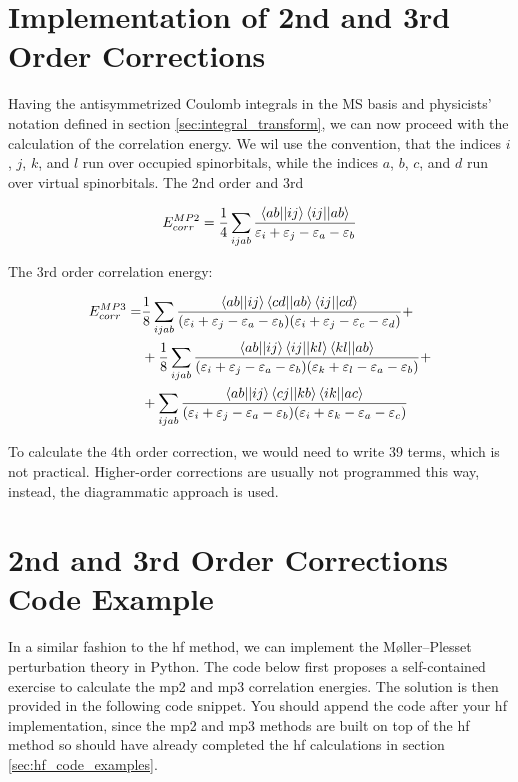 \section{Implementation of 2nd and 3rd Order Corrections}

Having the antisymmetrized Coulomb integrals in the MS basis and physicists' notation defined in section \ref{sec:integral_transform}, we can now proceed with the calculation of the correlation energy. We wil use the convention, that the indices \(i\), \(j\), \(k\), and \(l\) run over occupied spinorbitals, while the indices \(a\), \(b\), \(c\), and \(d\) run over virtual spinorbitals. The 2nd order and 3rd

\begin{equation}
E_{corr}^{MP2}=\frac{1}{4}\sum_{ijab}\frac{\braket{ab||ij}\braket{ij||ab}}{\varepsilon_i+\varepsilon_j-\varepsilon_a-\varepsilon_b}
\end{equation}

The 3rd order correlation energy:

\begin{align}
E_{corr}^{MP3}=&\frac{1}{8}\sum_{ijab}\frac{\braket{ab||ij}\braket{cd||ab}\braket{ij||cd}}{(\varepsilon_i+\varepsilon_j-\varepsilon_a-\varepsilon_b)(\varepsilon_i+\varepsilon_j-\varepsilon_c-\varepsilon_d)}+\nonumber \\
&+\frac{1}{8}\sum_{ijab}\frac{\braket{ab||ij}\braket{ij||kl}\braket{kl||ab}}{(\varepsilon_i+\varepsilon_j-\varepsilon_a-\varepsilon_b)(\varepsilon_k+\varepsilon_l-\varepsilon_a-\varepsilon_b)}+\nonumber \\
&+\sum_{ijab}\frac{\braket{ab||ij}\braket{cj||kb}\braket{ik||ac}}{(\varepsilon_i+\varepsilon_j-\varepsilon_a-\varepsilon_b)(\varepsilon_i+\varepsilon_k-\varepsilon_a-\varepsilon_c)}
\end{align}

To calculate the 4th order correction, we would need to write 39 terms, which is not practical. Higher-order corrections are usually not programmed this way, instead, the diagrammatic approach is used.\cite{1014569052,10.1016/0010-4655!73!90016-7,10.1016/0010-4655!73!90017-9}

\section{2nd and 3rd Order Corrections Code Example}

In a similar fashion to the \acrshort{hf} method, we can implement the Møller--Plesset perturbation theory in Python. The code below first proposes a self-contained exercise to calculate the \acrfull{mp2} and \acrfull{mp3} correlation energies. The solution is then provided in the following code snippet. You should append the code after your \acrshort{hf} implementation, since the \acrshort{mp2} and \acrshort{mp3} methods are built on top of the \acrshort{hf} method so should have already completed the \acrshort{hf} calculations in section \ref{sec:hf_code_examples}.

